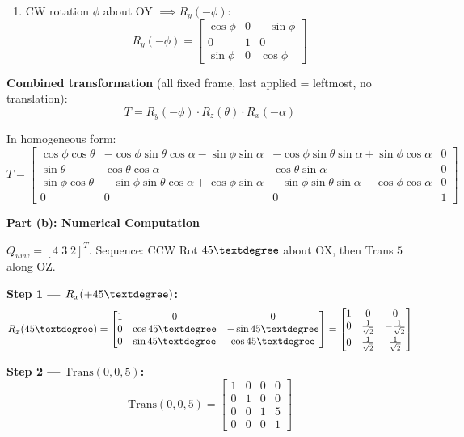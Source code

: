 \documentclass[12pt,a3paper]{article}
\begin{document}
\begin{enumerate}
\begin{tcolorbox}[enhanced,breakable,ansbox,colback=cB!4,colframe=cB,
  boxrule=0.8pt,arc=5pt,
  title={\textbf{Answer}},fonttitle=\bfseries\color{white},
  colbacktitle=cB]
\begin{enumerate}[label=\textbf{\arabic*.}]
  \item CW rotation $\phi$ about OY $\implies R_y(-\phi)$:
    \[
      R_y(-\phi) =
      \begin{bmatrix}
        \cos\phi & 0 & -\sin\phi \\
        0        & 1 & 0         \\
        \sin\phi & 0 & \cos\phi
      \end{bmatrix}
    \]
\end{enumerate}

\textbf{Combined transformation} (all fixed frame, last applied =
leftmost, no translation):
\[
  \boxed{T = R_y(-\phi)\cdot R_z(\theta)\cdot R_x(-\alpha)}
\]

In homogeneous form:
\[
  T =
  \begin{bmatrix}
    \cos\phi\cos\theta &
    -\cos\phi\sin\theta\cos\alpha - \sin\phi\sin\alpha &
    -\cos\phi\sin\theta\sin\alpha + \sin\phi\cos\alpha &
    0 \\[4pt]
    \sin\theta &
    \cos\theta\cos\alpha &
    \cos\theta\sin\alpha &
    0 \\[4pt]
    \sin\phi\cos\theta &
    -\sin\phi\sin\theta\cos\alpha + \cos\phi\sin\alpha &
    -\sin\phi\sin\theta\sin\alpha - \cos\phi\cos\alpha &
    0 \\[4pt]
    0 & 0 & 0 & 1
  \end{bmatrix}
\]

\medskip
\textbf{Part (b): Numerical Computation}

$Q_{uvw} = [4\;3\;2]^T$. Sequence: CCW Rot $45\textdegree$ about OX,
then Trans $5$ along OZ.

\textbf{Step 1 — $R_x(+45\textdegree)$:}
\[
  R_x(45\textdegree) =
  \begin{bmatrix}
    1 & 0                     & 0                    \\
    0 & \cos45\textdegree  & -\sin45\textdegree \\
    0 & \sin45\textdegree  &  \cos45\textdegree
  \end{bmatrix}
  =
  \begin{bmatrix}
    1 & 0 & 0 \\
    0 & \frac{1}{\sqrt{2}} & -\frac{1}{\sqrt{2}} \\[4pt]
    0 & \frac{1}{\sqrt{2}} &  \frac{1}{\sqrt{2}}
  \end{bmatrix}
\]

\textbf{Step 2 — $\mathrm{Trans}(0,0,5)$:}
\[
  \mathrm{Trans}(0,0,5) =
  \begin{bmatrix}1&0&0&0\\0&1&0&0\\0&0&1&5\\0&0&0&1\end{bmatrix}
\]


\end{tcolorbox}
\end{enumerate}
\end{document}
